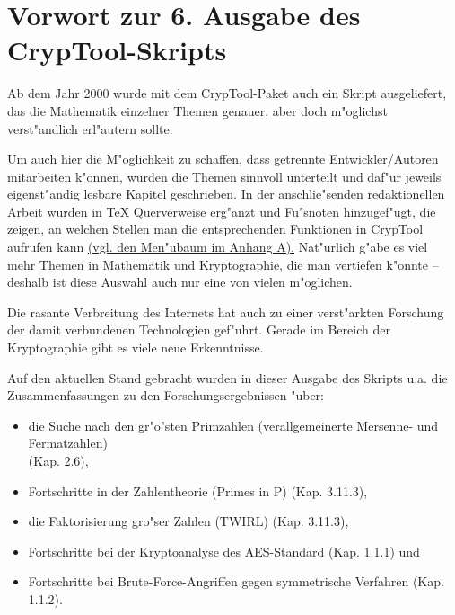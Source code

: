 

\section*{Vorwort zur 6. Ausgabe des CrypTool-Skripts}  

Ab dem Jahr 2000 wurde mit dem CrypTool-Paket auch ein Skript 
ausgeliefert, das die Mathematik einzelner Themen genauer, aber doch 
m"oglichst verst"andlich erl"autern sollte.

Um auch hier die M"oglichkeit zu schaffen, dass getrennte Entwickler/Autoren
mitarbeiten k"onnen, wurden die Themen sinnvoll unterteilt und daf"ur jeweils
eigenst"andig lesbare Kapitel geschrieben. In der anschlie"senden redaktionellen
Arbeit wurden in TeX Querverweise erg"anzt und Fu"snoten hinzugef"ugt, die
zeigen, an welchen Stellen man die entsprechenden Funktionen in
CrypTool aufrufen kann 
\hyperlink{appendix-menutree}{(vgl. den Men"ubaum im Anhang A).}
Nat"urlich g"abe es viel mehr Themen in Mathematik und Kryptographie, die
man vertiefen k"onnte -- deshalb ist diese Auswahl auch nur eine von
vielen m"oglichen.

Die rasante Verbreitung des Internets hat auch zu einer verst"arkten 
Forschung der damit verbundenen Technologien gef"uhrt. Gerade im Bereich 
der Kryptographie gibt es viele neue Erkenntnisse.

Auf den aktuellen Stand gebracht wurden in dieser Ausgabe 
des Skripts u.a. die Zusammenfassungen zu den Forschungsergebnissen "uber:                   
\vspace{-7pt}
\begin{itemize}
  \item die Suche nach den gr"o"sten Primzahlen (verallgemeinerte
        Mersenne- und Fermatzahlen) \\ (Kap. 2.6),
  \item Fortschritte in der Zahlentheorie (\glqq Primes in P\grqq) (Kap. 3.11.3),
  \item die Faktorisierung gro"ser Zahlen (TWIRL) (Kap. 3.11.3),
  \item Fortschritte bei der Kryptoanalyse des AES-Standard (Kap. 1.1.1) und
  \item Fortschritte bei Brute-Force-Angriffen gegen symmetrische Verfahren
	(Kap. 1.1.2).
\end{itemize}

